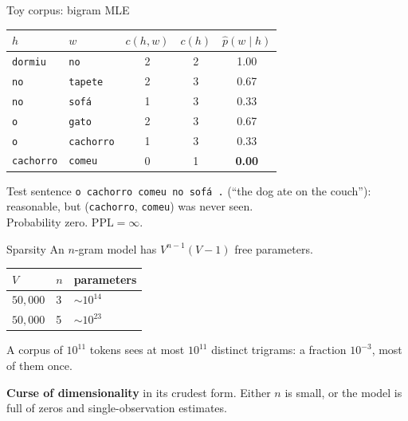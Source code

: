\documentclass[11pt,aspectratio=169]{beamer}
\newcommand{\PPL}{\mathrm{PPL}}
\newcommand{\dest}[1]{\textcolor{structure}{\textbf{#1}}}
\begin{document}
\begin{frame}{Toy corpus: bigram MLE}
  \begin{center}
  \begin{tabular}{@{}llccc@{}}
    \toprule
    $h$ & $w$ & $c(h,w)$ & $c(h)$ & $\hat p(w\mid h)$ \\
    \midrule
    \texttt{dormiu} & \texttt{no} & 2 & 2 & 1.00 \\
    \texttt{no} & \texttt{tapete} & 2 & 3 & 0.67 \\
    \texttt{no} & \texttt{sofá} & 1 & 3 & 0.33 \\
    \texttt{o} & \texttt{gato} & 2 & 3 & 0.67 \\
    \texttt{o} & \texttt{cachorro} & 1 & 3 & 0.33 \\
    \texttt{cachorro} & \texttt{comeu} & 0 & 1 & \dest{0.00} \\
    \bottomrule
  \end{tabular}
  \end{center}

  \vspace{0.8em}
  Test sentence \texttt{o cachorro comeu no sofá .} (``the dog ate on the couch''):
  reasonable, but (\texttt{cachorro}, \texttt{comeu}) was never seen.\\
  Probability zero. $\PPL = \infty$.
\end{frame}

\begin{frame}{Sparsity}
  An $n$-gram model has $V^{n-1}(V-1)$ free parameters.

  \vspace{0.6em}
  \begin{center}
  \begin{tabular}{@{}lll@{}}
    \toprule
    $V$ & $n$ & parameters \\
    \midrule
    $50{,}000$ & 3 & $\sim 10^{14}$ \\
    $50{,}000$ & 5 & $\sim 10^{23}$ \\
    \bottomrule
  \end{tabular}
  \end{center}

  \vspace{0.6em}
  A corpus of $10^{11}$ tokens sees at most $10^{11}$ distinct trigrams: a fraction
  $10^{-3}$, most of them once.

  \vspace{0.8em}
  \dest{Curse of dimensionality} in its crudest form. Either $n$ is small, or the model is
  full of zeros and single-observation estimates.
\end{frame}
\end{document}
